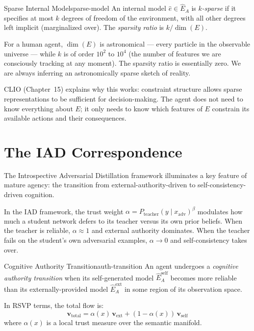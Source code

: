 \begin{definition}{Sparse Internal Model}{sparse-model}
  An internal model $\hat{e} \in \hat{E}_A$ is \emph{$k$-sparse} if it
  specifies at most $k$ degrees of freedom of the environment, with all
  other degrees left implicit (marginalized over). The \emph{sparsity
  ratio} is $k / \dim(E)$.
\end{definition}

For a human agent, $\dim(E)$ is astronomical — every particle in the
observable universe — while $k$ is of order $10^2$ to $10^4$ (the
number of features we are consciously tracking at any moment). The
sparsity ratio is essentially zero. We are always inferring an
astronomically sparse sketch of reality.

CLIO (Chapter~15) explains why this works: constraint structure allows
sparse representations to be sufficient for decision-making. The agent
does not need to know everything about $E$; it only needs to know which
features of $E$ constrain its available actions and their consequences.

\section{The IAD Correspondence}

The Introspective Adversarial Distillation framework illuminates a key
feature of mature agency: the transition from external-authority-driven
to self-consistency-driven cognition.

In the IAD framework, the trust weight $\alpha = P_{\text{teacher}}
(y \mid x_{\text{adv}})^\beta$ modulates how much a student network
defers to its teacher versus its own prior beliefs. When the teacher is
reliable, $\alpha \approx 1$ and external authority dominates. When the
teacher fails on the student's own adversarial examples, $\alpha \to 0$
and self-consistency takes over.

\begin{definition}{Cognitive Authority Transition}{auth-transition}
  An agent undergoes a \emph{cognitive authority transition} when its
  self-generated model $\hat{E}_A^{\text{self}}$ becomes more reliable
  than its externally-provided model $\hat{E}_A^{\text{ext}}$ in some
  region of its observation space.

  In RSVP terms, the total flow is:
  \[
    \mathbf{v}_{\text{total}} = \alpha(x)\,\mathbf{v}_{\text{ext}}
    + (1-\alpha(x))\,\mathbf{v}_{\text{self}}
  \]
  where $\alpha(x)$ is a local trust measure over the semantic manifold.
\end{definition}

